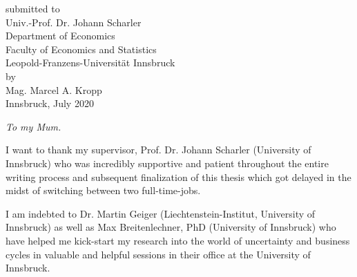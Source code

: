 \documentclass[a4paper,11pt,listof=nochaptergap,oneside,pointednumbers,bibtotoc,bigheadings,liststotoc]{scrbook}
\theoremstyle{mysatz}
\theoremstyle{mydefinition}
\theoremstyle{mytheorem}
\theoremstyle{mybemerkung}
\begin{document}
\begin{titlepage}
\begin{center}
        submitted to\\
        Univ.-Prof. Dr. Johann Scharler \\[10mm]
        Department of Economics\\
        Faculty of Economics and Statistics\\
        Leopold-Franzens-Universität Innsbruck \\[10mm]
        by \\ Mag. Marcel A. Kropp \\[10mm]
        Innsbruck, July 2020
    \end{center}
\end{titlepage}

\restoregeometry

\thispagestyle{empty} %
\null{}
    \begin{flushright}
       \large \textit{To my Mum.}\\
    \end{flushright}
\null


\newpage
\thispagestyle{empty} %


\vspace*{80px}
I want to thank my supervisor, Prof. Dr. Johann Scharler (University of Innsbruck) who was incredibly supportive and patient throughout the entire writing process and subsequent finalization of this thesis which got delayed in the midst of switching between two full-time-jobs.

I am indebted to Dr. Martin Geiger (Liechtenstein-Institut, University of Innsbruck) as well as Max Breitenlechner, PhD (University of Innsbruck) who have helped me kick-start my research into the world of uncertainty and business cycles in valuable and helpful sessions in their office at the University of Innsbruck. 
\end{document}
